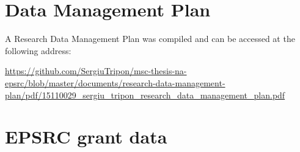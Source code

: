 {}
\renewcommand*{\arraystretch}{1.5}

\appendix

\chapter{Data Management Plan}
\label{appendix:data_management_plan}

A Research Data Management Plan was compiled and can be accessed at the following address:

\url{https://github.com/SergiuTripon/msc-thesis-na-epsrc/blob/master/documents/research-data-management-plan/pdf/15110029_sergiu_tripon_research_data_management_plan.pdf}

\chapter{EPSRC grant data}
\label{appendix:epsrc_grant_data}

